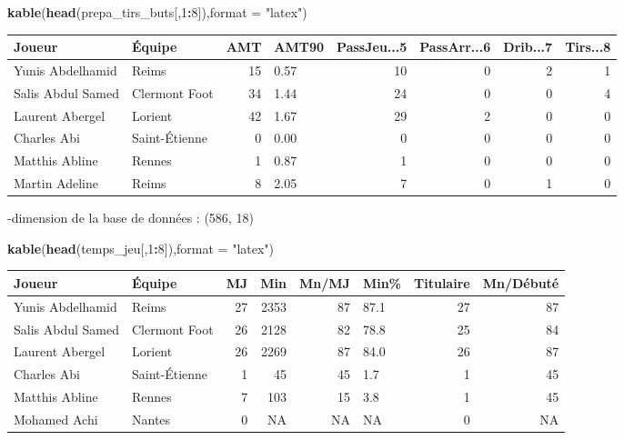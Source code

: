 \documentclass[7pt,]{report}
\newenvironment{Shaded}{\begin{snugshade}}{\end{snugshade}}
\newcommand{\DataTypeTok}[1]{\textcolor[rgb]{0.13,0.29,0.53}{#1}}
\newcommand{\DecValTok}[1]{\textcolor[rgb]{0.00,0.00,0.81}{#1}}
\newcommand{\KeywordTok}[1]{\textcolor[rgb]{0.13,0.29,0.53}{\textbf{#1}}}
\newcommand{\NormalTok}[1]{#1}
\newcommand{\OperatorTok}[1]{\textcolor[rgb]{0.81,0.36,0.00}{\textbf{#1}}}
\newcommand{\StringTok}[1]{\textcolor[rgb]{0.31,0.60,0.02}{#1}}
\begin{document}
\begin{Shaded}
\begin{Highlighting}[]
\KeywordTok{kable}\NormalTok{(}\KeywordTok{head}\NormalTok{(prepa_tirs_buts[,}\DecValTok{1}\OperatorTok{:}\DecValTok{8}\NormalTok{]),}\DataTypeTok{format =} \StringTok{"latex"}\NormalTok{)}
\end{Highlighting}
\end{Shaded}

\begin{tabular}{l|l|r|l|r|r|r|r}
\hline
Joueur & Équipe & AMT & AMT90 & PassJeu...5 & PassArr...6 & Drib...7 & Tirs...8\\
\hline
Yunis Abdelhamid & Reims & 15 & 0.57 & 10 & 0 & 2 & 1\\
\hline
Salis Abdul Samed & Clermont Foot & 34 & 1.44 & 24 & 0 & 0 & 4\\
\hline
Laurent Abergel & Lorient & 42 & 1.67 & 29 & 2 & 0 & 0\\
\hline
Charles Abi & Saint-Étienne & 0 & 0.00 & 0 & 0 & 0 & 0\\
\hline
Matthis Abline & Rennes & 1 & 0.87 & 1 & 0 & 0 & 0\\
\hline
Martin Adeline & Reims & 8 & 2.05 & 7 & 0 & 1 & 0\\
\hline
\end{tabular}

-dimension de la base de données : (586, 18)

\begin{Shaded}
\begin{Highlighting}[]
\KeywordTok{kable}\NormalTok{(}\KeywordTok{head}\NormalTok{(temps_jeu[,}\DecValTok{1}\OperatorTok{:}\DecValTok{8}\NormalTok{]),}\DataTypeTok{format =} \StringTok{"latex"}\NormalTok{)}
\end{Highlighting}
\end{Shaded}

\begin{tabular}{l|l|r|r|r|l|r|r}
\hline
Joueur & Équipe & MJ & Min & Mn/MJ & Min\% & Titulaire & Mn/Débuté\\
\hline
Yunis Abdelhamid & Reims & 27 & 2353 & 87 & 87.1 & 27 & 87\\
\hline
Salis Abdul Samed & Clermont Foot & 26 & 2128 & 82 & 78.8 & 25 & 84\\
\hline
Laurent Abergel & Lorient & 26 & 2269 & 87 & 84.0 & 26 & 87\\
\hline
Charles Abi & Saint-Étienne & 1 & 45 & 45 & 1.7 & 1 & 45\\
\hline
Matthis Abline & Rennes & 7 & 103 & 15 & 3.8 & 1 & 45\\
\hline
Mohamed Achi & Nantes & 0 & NA & NA & NA & 0 & NA\\
\hline
\end{tabular}
\end{document}
